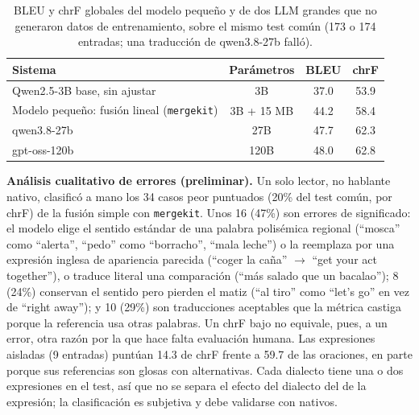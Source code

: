 \documentclass[11pt,a4paper]{article}
\begin{document}
\begin{table}[ht]
\centering
\small
\begin{tabular}{lccc}
\toprule
\textbf{Sistema} & \textbf{Parámetros} & \textbf{BLEU} & \textbf{chrF} \\
\midrule
Qwen2.5-3B base, sin ajustar & 3B & 37.0 & 53.9 \\
Modelo pequeño: fusión lineal (\texttt{mergekit}) & 3B + 15 MB & 44.2 & 58.4 \\
qwen3.8-27b & 27B & 47.7 & 62.3 \\
gpt-oss-120b & 120B & 48.0 & 62.8 \\
\bottomrule
\end{tabular}
\caption{BLEU y chrF globales del modelo pequeño y de dos LLM grandes que no generaron datos de entrenamiento, sobre el mismo test común (173 o 174 entradas; una traducción de qwen3.8-27b falló).}
\label{tab:pi3}
\end{table}

\textbf{Análisis cualitativo de errores (preliminar).} Un solo lector, no hablante nativo, clasificó a mano los 34 casos peor puntuados (20\% del test común, por chrF) de la fusión simple con \texttt{mergekit}. Unos 16 (47\%) son errores de significado: el modelo elige el sentido estándar de una palabra polisémica regional (``mosca'' como ``alerta'', ``pedo'' como ``borracho'', ``mala leche'') o la reemplaza por una expresión inglesa de apariencia parecida (``coger la caña'' $\to$ ``get your act together''), o traduce literal una comparación (``más salado que un bacalao''); 8 (24\%) conservan el sentido pero pierden el matiz (``al tiro'' como ``let's go'' en vez de ``right away''); y 10 (29\%) son traducciones aceptables que la métrica castiga porque la referencia usa otras palabras. Un chrF bajo no equivale, pues, a un error, otra razón por la que hace falta evaluación humana. Las expresiones aisladas (9 entradas) puntúan 14.3 de chrF frente a 59.7 de las oraciones, en parte porque sus referencias son glosas con alternativas. Cada dialecto tiene una o dos expresiones en el test, así que no se separa el efecto del dialecto del de la expresión; la clasificación es subjetiva y debe validarse con nativos.
\end{document}
